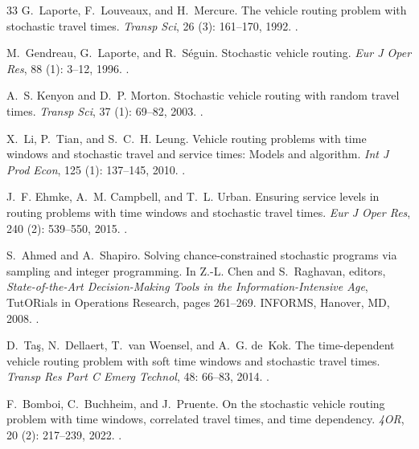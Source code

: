 \documentclass[12pt,letterpaper]{article}
\begin{document}
\begin{thebibliography}{33}
G.~Laporte, F.~Louveaux, and H.~Mercure.
\newblock The vehicle routing problem with stochastic travel times.
\newblock \emph{Transp Sci}, 26 (3): 161--170, 1992.
\newblock {}.

M.~Gendreau, G.~Laporte, and R.~S{\'e}guin.
\newblock Stochastic vehicle routing.
\newblock \emph{Eur J Oper Res}, 88 (1): 3--12, 1996.
\newblock {}.

A.~S. Kenyon and D.~P. Morton.
\newblock Stochastic vehicle routing with random travel times.
\newblock \emph{Transp Sci}, 37 (1): 69--82, 2003.
\newblock {}.

X.~Li, P.~Tian, and S.~C.~H. Leung.
\newblock Vehicle routing problems with time windows and stochastic travel and
  service times: Models and algorithm.
\newblock \emph{Int J Prod Econ}, 125 (1): 137--145, 2010.
\newblock {}.

J.~F. Ehmke, A.~M. Campbell, and T.~L. Urban.
\newblock Ensuring service levels in routing problems with time windows and
  stochastic travel times.
\newblock \emph{Eur J Oper Res}, 240 (2): 539--550, 2015.
\newblock {}.

S.~Ahmed and A.~Shapiro.
\newblock Solving chance-constrained stochastic programs via sampling and
  integer programming.
\newblock In Z.-L. Chen and S.~Raghavan, editors, \emph{State-of-the-Art
  Decision-Making Tools in the Information-Intensive Age}, TutORials in
  Operations Research, pages 261--269. INFORMS, Hanover, MD, 2008.
\newblock {}.

D.~Ta{\c{s}}, N.~Dellaert, T.~van Woensel, and A.~G. de~Kok.
\newblock The time-dependent vehicle routing problem with soft time windows and
  stochastic travel times.
\newblock \emph{Transp Res Part C Emerg Technol}, 48: 66--83, 2014.
\newblock {}.

F.~Bomboi, C.~Buchheim, and J.~Pruente.
\newblock On the stochastic vehicle routing problem with time windows,
  correlated travel times, and time dependency.
\newblock \emph{4OR}, 20 (2): 217--239, 2022.
\newblock {}.


\end{thebibliography}
\end{document}
